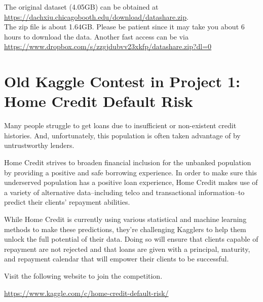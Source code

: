 \documentclass[11pt]{article}
\begin{document}
The original dataset (4.05GB) can be obtained at \\ 
\url{https://dachxiu.chicagobooth.edu/download/datashare.zip}. \\
The zip file is about 1.64GB. Please be patient since it may take you about 6 hours to download the data. Another fast access can be via \\
\url{https://www.dropbox.com/s/zzgjdubvv23xkfp/datashare.zip?dl=0}


\section{Old Kaggle Contest in Project 1: Home Credit Default Risk}

Many people struggle to get loans due to insufficient or non-existent credit histories. And, unfortunately, this population is often taken advantage of by untrustworthy lenders.

Home Credit strives to broaden financial inclusion for the unbanked population by providing a positive and safe borrowing experience. In order to make sure this underserved population has a positive loan experience, Home Credit makes use of a variety of alternative data--including telco and transactional information--to predict their clients' repayment abilities.

While Home Credit is currently using various statistical and machine learning methods to make these predictions, they're challenging Kagglers to help them unlock the full potential of their data. Doing so will ensure that clients capable of repayment are not rejected and that loans are given with a principal, maturity, and repayment calendar that will empower their clients to be successful.

Visit the following website to join the competition. 

\url{https://www.kaggle.com/c/home-credit-default-risk/}

\end{document}
